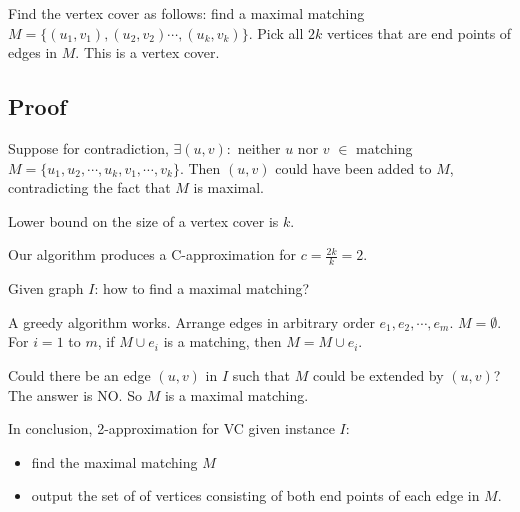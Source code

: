 Find the vertex cover as follows: find a maximal matching $M = \{(u_1, v_1), (u_2, v_2) \cdots , (u_k, v_k)\}$. Pick all $2k$ vertices that are end points of edges in $M$. This is a vertex cover.

\subsection{Proof}
Suppose for contradiction, $\exists (u, v):$ neither $u$ nor $v$ $\in$ matching $M = \{u_1, u_2, \cdots, u_k, v_1, \cdots, v_k\}$. Then $(u, v)$ could have been added to $M$, contradicting the fact that $M$ is maximal.

Lower bound on the size of a vertex cover is $k$.

Our algorithm produces a C-approximation for $c = \frac{2k}{k} = 2$. 

Given graph $I$: how to find a maximal matching?  

A greedy algorithm works. Arrange edges in arbitrary order $e_1, e_2, \cdots, e_m$. $M = \emptyset$. For $i = 1$ to $m$, if $M \cup {e_i}$ is a matching, then $M = M \cup {e_i}$.

Could there be an edge $(u, v)$ in $I$ such that $M$ could be extended by $(u, v)$? The answer is NO. So $M$ is a maximal matching.

In conclusion, 2-approximation for VC given instance $I$:
\begin{itemize}
	\item find the maximal matching $M$
	\item output the set of of vertices consisting of both end points of each edge in $M$.
\end{itemize}























































